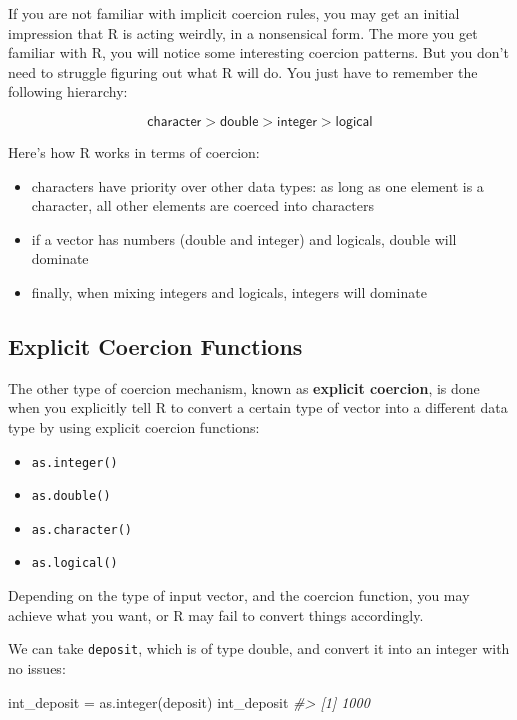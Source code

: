 \documentclass[
]{book}
\newenvironment{Shaded}{\begin{snugshade}}{\end{snugshade}}
\newcommand{\CommentTok}[1]{\textcolor[rgb]{0.56,0.35,0.01}{\textit{#1}}}
\newcommand{\FunctionTok}[1]{\textcolor[rgb]{0.00,0.00,0.00}{#1}}
\newcommand{\NormalTok}[1]{#1}
\newcommand{\OtherTok}[1]{\textcolor[rgb]{0.56,0.35,0.01}{#1}}
\providecommand{\tightlist}{%
  \setlength{\itemsep}{0pt}\setlength{\parskip}{0pt}}
\begin{document}
If you are not familiar with implicit coercion rules, you may get an initial
impression that R is acting weirdly, in a nonsensical form. The more you get
familiar with R, you will notice some interesting coercion patterns. But you
don't need to struggle figuring out what R will do. You just have to remember
the following hierarchy:

\[
\mathsf{character > double > integer > logical}
\]

Here's how R works in terms of coercion:

\begin{itemize}
\item
  characters have priority over other data types: as long as one element is
  a character, all other elements are coerced into characters
\item
  if a vector has numbers (double and integer) and logicals, double will
  dominate
\item
  finally, when mixing integers and logicals, integers will dominate
\end{itemize}

\hypertarget{explicit-coercion-functions}{%
\subsection{Explicit Coercion Functions}\label{explicit-coercion-functions}}

The other type of coercion mechanism, known as \textbf{explicit coercion}, is done
when you explicitly tell R to convert a certain type of vector into a different
data type by using explicit coercion functions:

\begin{itemize}
\tightlist
\item
  \texttt{as.integer()}
\item
  \texttt{as.double()}
\item
  \texttt{as.character()}
\item
  \texttt{as.logical()}
\end{itemize}

Depending on the type of input vector, and the coercion function, you may
achieve what you want, or R may fail to convert things accordingly.

We can take \texttt{deposit}, which is of type double, and convert it into an integer
with no issues:

\begin{Shaded}
\begin{Highlighting}[]
\NormalTok{int\_deposit }\OtherTok{=} \FunctionTok{as.integer}\NormalTok{(deposit)}
\NormalTok{int\_deposit}
\CommentTok{\#\textgreater{} [1] 1000}
\end{Highlighting}
\end{Shaded}
\end{document}
